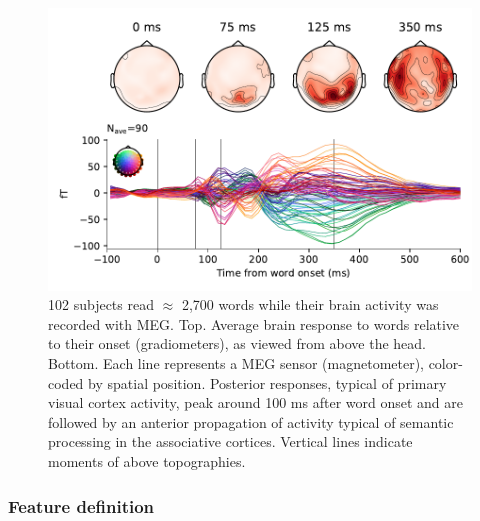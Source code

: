 \begin{figure}[t!]
  \centering
  \includegraphics[width=\textwidth, trim=0cm 0cm 0cm 0cm, clip=True]{figures/meg_evoked.pdf}
  \caption{102 subjects read $\approx$ 2,700 words while their brain activity was recorded with MEG. Top. Average brain response to words relative to their onset (gradiometers), as viewed from above the head. Bottom. Each line represents a MEG sensor (magnetometer), color-coded by spatial position. Posterior responses, typical of primary visual cortex activity, peak around 100 ms after word onset and are followed by an anterior propagation of activity typical of semantic processing in the associative cortices. Vertical lines indicate moments of above topographies.
  }
  \label{fig:meg_evoked}
\end{figure}

\subsubsection{Feature definition}

